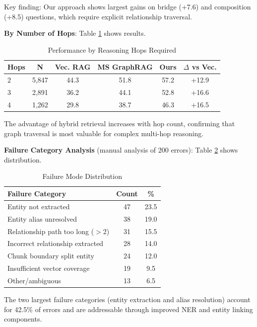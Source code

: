 \documentclass[conference]{IEEEtran}
\begin{document}
Key finding: Our approach shows largest gains on bridge (+7.6) and composition (+8.5) questions, which require explicit relationship traversal.

\textbf{By Number of Hops}: Table \ref{tab:hops} shows results.

\begin{table}[htbp]
\caption{Performance by Reasoning Hops Required}
\label{tab:hops}
\centering
\begin{tabular}{lccccc}
\toprule
\textbf{Hops} & \textbf{N} & \textbf{Vec. RAG} & \textbf{MS GraphRAG} & \textbf{Ours} & \textbf{$\Delta$ vs Vec.} \\
\midrule
2 & 5,847 & 44.3 & 51.8 & 57.2 & +12.9 \\
3 & 2,891 & 36.2 & 44.1 & 52.8 & +16.6 \\
4 & 1,262 & 29.8 & 38.7 & 46.3 & +16.5 \\
\bottomrule
\end{tabular}
\end{table}

The advantage of hybrid retrieval increases with hop count, confirming that graph traversal is most valuable for complex multi-hop reasoning.

\textbf{Failure Category Analysis} (manual analysis of 200 errors): Table \ref{tab:failures} shows distribution.

\begin{table}[htbp]
\caption{Failure Mode Distribution}
\label{tab:failures}
\centering
\begin{tabular}{lcc}
\toprule
\textbf{Failure Category} & \textbf{Count} & \textbf{\%} \\
\midrule
Entity not extracted & 47 & 23.5 \\
Entity alias unresolved & 38 & 19.0 \\
Relationship path too long ($>$2) & 31 & 15.5 \\
Incorrect relationship extracted & 28 & 14.0 \\
Chunk boundary split entity & 24 & 12.0 \\
Insufficient vector coverage & 19 & 9.5 \\
Other/ambiguous & 13 & 6.5 \\
\bottomrule
\end{tabular}
\end{table}

The two largest failure categories (entity extraction and alias resolution) account for 42.5\% of errors and are addressable through improved NER and entity linking components.
\end{document}
